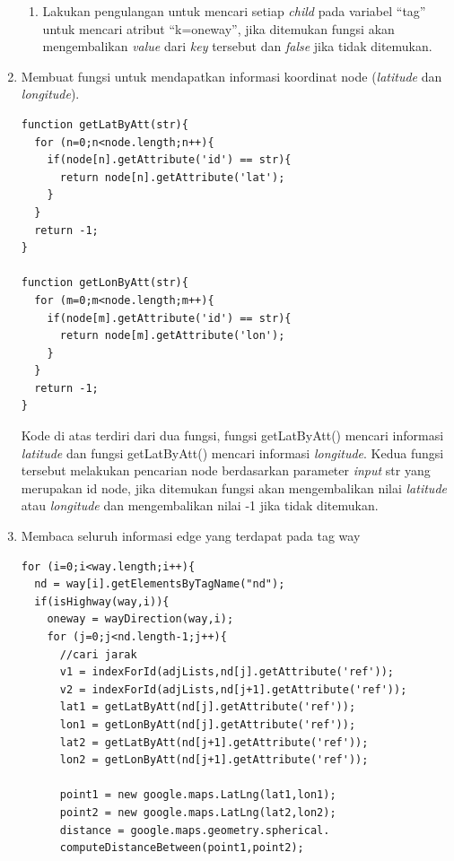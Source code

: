 \begin{enumerate}
\begin{enumerate}
  \item Lakukan pengulangan untuk mencari setiap \textit{child} pada variabel
  ``tag'' untuk mencari atribut ``k=oneway'', jika ditemukan fungsi akan
  mengembalikan \textit{value} dari \textit{key} tersebut dan \textit{false}
  jika tidak ditemukan.
  \end{enumerate}

  \item Membuat fungsi untuk mendapatkan informasi koordinat node
  (\textit{latitude} dan \textit{longitude}).
\begin{verbatim}
function getLatByAtt(str){
  for (n=0;n<node.length;n++){
    if(node[n].getAttribute('id') == str){
      return node[n].getAttribute('lat');
    }
  }
  return -1;
}

function getLonByAtt(str){
  for (m=0;m<node.length;m++){
    if(node[m].getAttribute('id') == str){
      return node[m].getAttribute('lon');
    }
  }
  return -1;
}
\end{verbatim}
  Kode di atas terdiri dari dua fungsi, fungsi getLatByAtt() mencari informasi
  \textit{latitude} dan fungsi getLatByAtt() mencari informasi
  \textit{longitude}. Kedua fungsi tersebut melakukan pencarian node berdasarkan
  parameter \textit{input} str yang merupakan id node, jika ditemukan fungsi
  akan mengembalikan nilai \textit{latitude} atau \textit{longitude} dan
  mengembalikan nilai -1 jika tidak ditemukan.

  \item Membaca seluruh informasi edge yang terdapat pada tag way
\begin{verbatim}
for (i=0;i<way.length;i++){
  nd = way[i].getElementsByTagName("nd");
  if(isHighway(way,i)){
    oneway = wayDirection(way,i);
    for (j=0;j<nd.length-1;j++){
      //cari jarak 
      v1 = indexForId(adjLists,nd[j].getAttribute('ref'));
      v2 = indexForId(adjLists,nd[j+1].getAttribute('ref'));	
      lat1 = getLatByAtt(nd[j].getAttribute('ref'));
      lon1 = getLonByAtt(nd[j].getAttribute('ref'));
      lat2 = getLatByAtt(nd[j+1].getAttribute('ref'));
      lon2 = getLonByAtt(nd[j+1].getAttribute('ref'));
      
      point1 = new google.maps.LatLng(lat1,lon1);
      point2 = new google.maps.LatLng(lat2,lon2);
      distance = google.maps.geometry.spherical.
      computeDistanceBetween(point1,point2);
	  

\end{verbatim}
\end{enumerate}

